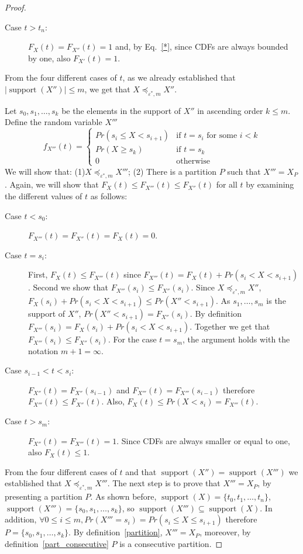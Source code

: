 \documentclass[review]{elsarticle}
\DeclareMathOperator{\supp}{support}
\DeclareMathOperator{\support}{support}
\begin{document}
\begin{proof}
\begin{description}
\item[Case $t > t_n$:] $F_{X}(t)= F_{X''}(t)=1$ and, by Eq.~\eqref{*}, since CDFs are always bounded by one, also $F_{X'}(t)=1$.

\end{description}
From the four different cases of $t$, as we already established that $|\supp(X'')|\leq m$, we get that $X \preceq_{\varepsilon^*,m} X''$. 

Let $s_0,s_1,\dots,s_k$ be the elements in the support of $X''$ in ascending order $k \leq m$. Define the random variable $X'''$
$$
f_{X'''}(t) = \begin{cases}
Pr(s_{i} \leq X < s_{i+1}) & \text{if } t=s_i \text{ for some } i < k \\ 
Pr(X \geq s_k)           & \text{if } t=s_k  \\ 
0                        & \text{otherwise}
\end{cases}
$$
We will show that: (1)$X \preceq_{\varepsilon^*,m} X'''$; (2) There is a partition $P$ such that $X'''=X_P$. 
Again, we will show that $F_{X}(t) \leq  F_{X'''}(t) \leq F_{X''}(t)$ for all $t$ by examining the different values of $t$ as follows: 
\begin{description}
\item[Case $t < s_0$:] $F_{X'''}(t)=F_{X''}(t)=F_{X}(t)=0$. 
\item[Case $t=s_i$:] First, $F_{X}(t) \leq F_{X'''}(t)$ since $F_{X'''}(t) = F_{X}(t)+Pr(s_{i} < X < s_{i+1})$.
Second we show that  $F_{X'''}(s_i) \leq F_{X''}(s_i)$. Since $X \preceq_{\varepsilon^*,m} X''$, $F_X(s_i) + Pr(s_i < X < s_{i+1}) \leq  Pr(X''<s_{i+1})$. As $s_1,\dots,s_m$ is the support of $X''$, $Pr(X''<s_{i+1}) = F_{X''}(s_i)$. By definition $F_{X'''}(s_i) = F_X(s_i) + Pr(s_i < X < s_{i+1})$. Together we get that $F_{X'''}(s_i) \leq F_{X''}(s_i)$. For the case $t=s_m$, the argument holds with the notation $m+1=\infty$. 

\item[Case $s_{i-1} < t < s_i$:] $F_{X''}(t)= F_{X''}(s_{i-1})$ and $F_{X'''}(t)= F_{X'''}(s_{i-1})$ therefore $F_{X'''}(t) \leq F_{X''}(t)$. Also, $F_X(t) \leq Pr(X<s_i) = F_{X'''}(t)$.
\item[Case $t > s_m$:] $F_{X''}(t)= F_{X'''}(t)=1$. Since CDFs are always smaller or equal to one, also $F_{X}(t)\leq1$. 
\end{description}
From the four different cases of $t$ and that $\supp(X'')=\supp(X''')$ we established that $X \preceq_{\varepsilon^*,m} X'''$. 
The next step is to prove that $X'''=X_P$, by presenting a partition $P$. As shown before, $\support(X)=\{t_0,t_1,\dots,t_n\}$,  $\support(X''')=\{s_0,s_1,\dots,s_k\}$, so $\support(X''')\subseteq \support(X)$. In addition, $\forall 0\leq i\leq m, Pr(X'''=s_i) = Pr(s_i \leq X \leq s_{i+1})$ therefore $P = \{s_0,s_1,\dots,s_k\}$.
By definition~\ref{partition}, $X'''=X_P$, moreover, by definition~\ref{part_consecutive} $P$ is a consecutive partition.
\end{proof}
\end{document}
